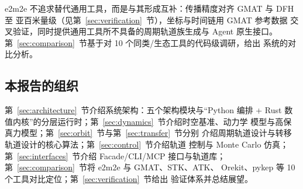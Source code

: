 e2m2e 不追求替代通用工具，而是与其形成互补：传播精度对齐 GMAT 与 DFH 至
亚百米量级（见第~\ref{sec:verification}~节），坐标与时间链用 GMAT 参考数据
交叉验证，同时提供通用工具所不具备的周期轨道族生成与 Agent 原生接口。
第~\ref{sec:comparison}~节基于对 10 个同类/生态工具的代码级调研，给出
系统的对比分析。

\subsection{本报告的组织}

第~\ref{sec:architecture}~节介绍系统架构：五个架构模块与“Python 编排 +
Rust 数值内核”的分层运行时；第~\ref{sec:dynamics}~节介绍时空基准、动力学
模型与高保真力模型；第~\ref{sec:orbit}~节与第~\ref{sec:transfer}~节分别
介绍周期轨道设计与转移轨道设计的核心算法；第~\ref{sec:control}~节介绍轨道
控制与 Monte Carlo 仿真；第~\ref{sec:interfaces}~节介绍 Facade/CLI/MCP
接口与轨道库；第~\ref{sec:comparison}~节将 e2m2e 与 GMAT、STK、ATK、
Orekit、pykep 等 10 个工具对比定位；第~\ref{sec:verification}~节给出
验证体系并总结展望。
